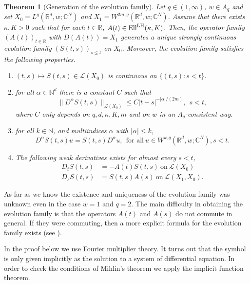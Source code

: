 \documentclass{amsart}
\theoremstyle{plain}
\newtheorem{theorem}{Theorem}[section]
\theoremstyle{remark}
\theoremstyle{plain}
\numberwithin{equation}{section}
\begin{document}
\begin{theorem}[Generation of the evolution family]\label{teoMihCondSys}
Let $q\in (1, \infty)$, $w\in A_q$ and set $X_0 = L^q({ \mathbb{R} }^d,w;{ \mathbb{C} }^N)$ and $X_1 = W^{2m,q}({ \mathbb{R} }^d,w;{ \mathbb{C} }^N)$. Assume that there exists $\kappa, K>0$ such that for each $t\in { \mathbb{R} }$, $A(t)\in{\rm Ell}^{\rm LH}(\kappa,K)$. Then, the operator family $(A(t))_{t\in { \mathbb{R} }}$ with $D(A(t)) = X_1$ generates a unique strongly continuous evolution family $(S(t,s))_{s\leq t}$ on $X_0$. Moreover, the evolution family satisfies the following properties.
\begin{enumerate}
\item\label{eq:Scont} $(t,s)\mapsto S(t,s)\in {{\mathscr L}}(X_0)$ is continuous on $\{(t,s):s<t\}$.
\item\label{eq:SDalphaest} for all $\alpha\in { \mathbb{N} }^d$ there is a constant $C$ such that
\[\|D^{\alpha} S(t,s)\|_{{{\mathscr L}}(X_0)} \leq C|t-s|^{-|\alpha|/(2m)}, \ \  s<t,\]
where $C$ only depends on $q, d,\kappa,K,m$ and on $w$ in an $A_q$-consistent way.
\item\label{eq:SDalphacomm} for all $k\in { \mathbb{N} }$, and multiindices $\alpha$ with $|\alpha|\leq k$,
\[D^{\alpha} S(t,s) u = S(t,s) D^{\alpha} u, \ \ \text{for all} \  u\in W^{k,q}({ \mathbb{R} }^d,w;{ \mathbb{C} }^N), s<t.\]
\item The following weak derivatives exists for almost every $s<t$,
\begin{align}
D_t S(t,s) & = - A(t) S(t,s) \ \text{on} \ {{\mathscr L}}(X_0)  \label{eq:propevol1}
\\ D_s S(t,s) & = S(t,s)A(s) \ \text{on} \ {{\mathscr L}}(X_1, X_0). \label{eq:propevol2}
\end{align}
\end{enumerate}
\end{theorem}

As far as we know the existence and uniqueness of the evolution family was unknown even in the case $w=1$ and $q=2$. The main difficulty in obtaining the evolution family is that the operators $A(t)$ and $A(s)$ do not commute in general. If they were commuting, then a more explicit formula for the evolution family exists (see \cite[Example 4.4]{GV}).

In the proof below we use Fourier multiplier theory. It turns out that the symbol is only given implicitly as the solution to a system of differential equation. In order to check the conditions of Mihlin's theorem we apply the implicit function theorem.
\end{document}
